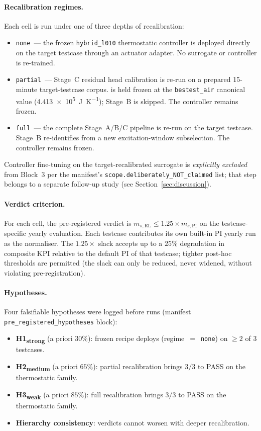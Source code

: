 \paragraph{Recalibration regimes.}
Each cell is run under one of three depths of recalibration:

\begin{itemize}
    \item \texttt{none}~--- the frozen \texttt{hybrid\_l010} thermostatic
    controller is deployed directly on the target testcase through an
    actuator adapter. No surrogate or controller is re-trained.
    \item \texttt{partial}~--- Stage~C residual head calibration is re-run
    on a prepared 15-minute target-testcase corpus. \czon{} is held frozen
    at the \texttt{bestest\_air} canonical value
    (\SI{4.413e5}{\joule\per\kelvin}); Stage~B is skipped. The controller
    remains frozen.
    \item \texttt{full}~--- the complete Stage~A/B/C pipeline is re-run on
    the target testcase. Stage~B re-identifies \czon{} from a new
    excitation-window subselection. The controller remains frozen.
\end{itemize}
Controller fine-tuning on the target-recalibrated surrogate is
\emph{explicitly excluded} from Block~3 per the manifest's
\texttt{scope.deliberately\_NOT\_claimed} list; that step belongs to a
separate follow-up study (see Section~\ref{sec:discussion}).

\paragraph{Verdict criterion.}
For each cell, the pre-registered verdict is
\(m_{s,\mathrm{RL}} \leq 1.25 \times m_{s,\mathrm{PI}}\) on the
testcase-specific yearly evaluation. Each testcase contributes its own
\boptest{} built-in PI yearly run as the normaliser. The \(1.25\times\)
slack accepts up to a $25\%$ degradation in composite KPI relative to the
default PI of that testcase; tighter post-hoc thresholds are permitted (the
slack can only be reduced, never widened, without violating
pre-registration).

\paragraph{Hypotheses.}
Four falsifiable hypotheses were logged before runs (manifest
\texttt{pre\_registered\_hypotheses} block):

\begin{itemize}
    \item \textbf{H1\textsubscript{strong}} (a priori $30\%$): frozen recipe
    deploys (regime~$=$~\texttt{none}) on $\geq 2$ of 3 testcases.
    \item \textbf{H2\textsubscript{medium}} (a priori $65\%$): partial
    recalibration brings $3/3$ to PASS on the thermostatic family.
    \item \textbf{H3\textsubscript{weak}} (a priori $85\%$): full
    recalibration brings $3/3$ to PASS on the thermostatic family.
    \item \textbf{Hierarchy consistency}: verdicts cannot worsen with
    deeper recalibration.
\end{itemize}

